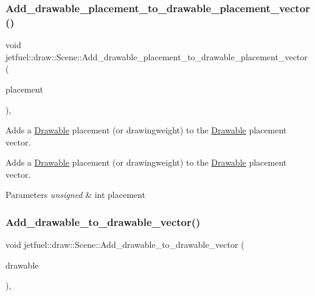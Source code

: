 \subsubsection{\texorpdfstring{Add\+\_\+drawable\+\_\+placement\+\_\+to\+\_\+drawable\+\_\+placement\+\_\+vector()}{Add\_drawable\_placement\_to\_drawable\_placement\_vector()}}
{\footnotesize\ttfamily void jetfuel\+::draw\+::\+Scene\+::\+Add\+\_\+drawable\+\_\+placement\+\_\+to\+\_\+drawable\+\_\+placement\+\_\+vector (\begin{DoxyParamCaption}\item[{const unsigned int}]{placement }\end{DoxyParamCaption})\hspace{0.3cm}{\ttfamily [inline]}, {\ttfamily [protected]}}



Adds a \hyperlink{classjetfuel_1_1draw_1_1Drawable}{Drawable} placement (or drawingweight) to the \hyperlink{classjetfuel_1_1draw_1_1Drawable}{Drawable} placement vector. 

Adds a \hyperlink{classjetfuel_1_1draw_1_1Drawable}{Drawable} placement (or drawingweight) to the \hyperlink{classjetfuel_1_1draw_1_1Drawable}{Drawable} placement vector.


\begin{DoxyParams}{Parameters}
{\em unsigned} & int placement \\
\hline
\end{DoxyParams}
\mbox{\label{classjetfuel_1_1draw_1_1Scene_a58984e589bd7ffa2940299fa88388765}} 
\subsubsection{\texorpdfstring{Add\+\_\+drawable\+\_\+to\+\_\+drawable\+\_\+vector()}{Add\_drawable\_to\_drawable\_vector()}}
{\footnotesize\ttfamily void jetfuel\+::draw\+::\+Scene\+::\+Add\+\_\+drawable\+\_\+to\+\_\+drawable\+\_\+vector (\begin{DoxyParamCaption}\item[{\hyperlink{classjetfuel_1_1draw_1_1Drawable}{Drawable} $\ast$}]{drawable }\end{DoxyParamCaption})\hspace{0.3cm}{\ttfamily [inline]}, {\ttfamily [protected]}}



